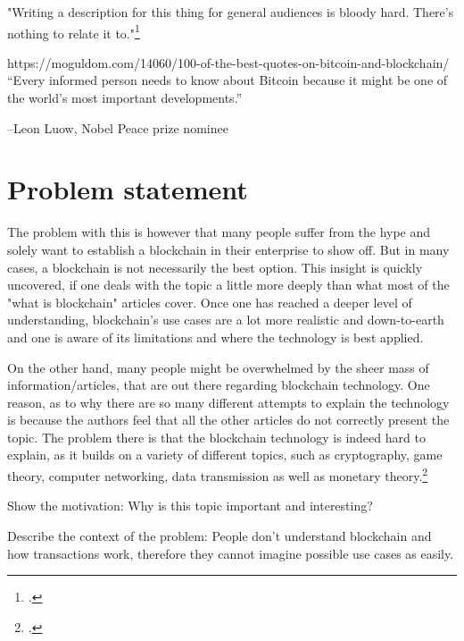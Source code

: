 "Writing a description for this thing for general audiences is bloody hard. There's nothing to relate it to."\footcite{NakamotoReSlashdotSubmission2010}

https://moguldom.com/14060/100-of-the-best-quotes-on-bitcoin-and-blockchain/
“Every informed person needs to know about Bitcoin because it might be one of the world’s most important developments.”

–Leon Luow, Nobel Peace prize nominee 
\section{Problem statement} \label{sec:Problem}

The problem with this is however that many people suffer from the hype and solely want to establish a blockchain in their enterprise to show off. But in many cases, a blockchain is not necessarily the best option. This insight is quickly uncovered, if one deals with the topic a little more deeply than what most of the "what is blockchain" articles cover. Once one has reached a deeper level of understanding, blockchain's use cases are a lot more realistic and down-to-earth and one is aware of its limitations and where the technology is best applied. 

On the other hand, many people might be overwhelmed by the sheer mass of information/articles, that are out there regarding blockchain technology. One reason, as to why there are so many different attempts to explain the technology is because the authors feel that all the other articles do not correctly present the topic. The problem there is that the blockchain technology is indeed hard to explain, as it builds on a variety of different topics, such as cryptography, game theory, computer networking, data transmission as well as monetary theory.\footcite[Cf.][]{LoppNobodyUnderstandsBitcoin2017}

Show the motivation: Why is this topic important and interesting?

Describe the context of the problem: People don't understand blockchain and how transactions work, therefore they cannot imagine possible use cases as easily.


